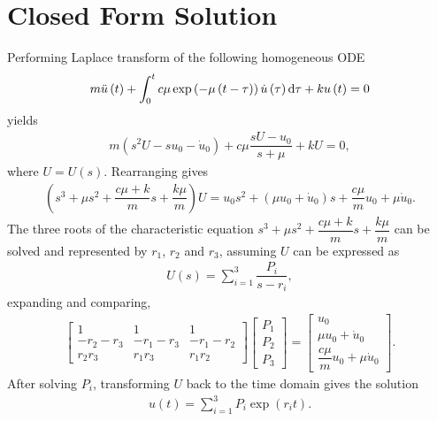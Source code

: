 \appendix
\section{Closed Form Solution}\label{sec:analytical_sdof}
Performing Laplace transform of the following homogeneous ODE
\begin{gather}\label{eq:single_exp}
m\ddot{u}\left(t\right)+\int_0^tc\mu\exp\left(-\mu\left(t-\tau\right)\right)\dot{u}\left(\tau\right)\mathrm{d}\tau+ku\left(t\right)=0
\end{gather}
yields
\begin{gather}
m\left(s^2U-su_0-\dot{u}_0\right)
+c\mu\dfrac{sU-u_0}{s+\mu}
+kU
=0,
\end{gather}
where $U=U\left(s\right)$. Rearranging gives
\begin{gather}
\left(
s^3
+\mu{}s^2
+\dfrac{c\mu+k}{m}s
+\dfrac{k\mu}{m}\right)U
=
u_0s^2
+\left(\mu{}u_0+\dot{u}_0\right)s
+\dfrac{c\mu{}}{m}u_0
+\mu\dot{u}_0.
\end{gather}
The three roots of the characteristic equation $s^3
+\mu{}s^2
+\dfrac{c\mu+k}{m}s
+\dfrac{k\mu}{m}$ can be solved and represented by $r_1$, $r_2$ and $r_3$, assuming $U$ can be expressed as
\begin{gather}
U\left(s\right)=\sum_{i=1}^3\dfrac{P_i}{s-r_i},
\end{gather}
expanding and comparing,
\begin{gather}
\begin{bmatrix}
1&1&1\\
-r_2-r_3&-r_1-r_3&-r_1-r_2\\
r_2r_3&r_1r_3&r_1r_2
\end{bmatrix}
\begin{bmatrix}
P_1\\P_2\\P_3
\end{bmatrix}
=
\begin{bmatrix}
u_0\\
\mu{}u_0+\dot{u}_0\\
\dfrac{c\mu{}}{m}u_0
+\mu\dot{u}_0
\end{bmatrix}.
\end{gather}
After solving $P_i$, transforming $U$ back to the time domain gives the solution
\begin{gather}
u(t)=\sum_{i=1}^3P_i\exp\left(r_it\right).
\end{gather}
